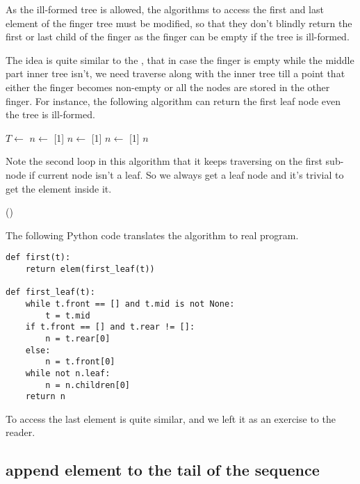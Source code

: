 \documentclass[UTF8]{article}
\begin{document}
As the ill-formed tree is allowed, the algorithms to access the first and last element of the
finger tree must be modified, so that they don't blindly return the first or last child
of the finger as the finger can be empty if the tree is ill-formed.

The idea is quite similar to the , that in case the finger is empty
while the middle part inner tree isn't, we need traverse along with the inner tree till a
point that either the finger becomes non-empty or all the nodes are stored in the
other finger. For instance, the following algorithm can return the first leaf node even
the tree is ill-formed.

\begin{algorithmic}
    \State $T \gets$ 
  \EndWhile
    \State $n \gets$ [1]
  \Else
    \State $n \gets$ [1]
  \EndIf
    \State $n \gets$ [1]
  \EndWhile
  \State \Return $n$
\EndFunction
\end{algorithmic}

Note the second loop in this algorithm that it keeps traversing on the first sub-node
if current node isn't a leaf. So we always get a leaf node and it's trivial to get
the element inside it.

\begin{algorithmic}
  \State \Return {}()
\EndFunction
\end{algorithmic}

The following Python code translates the algorithm to real program.

\lstset{language=Python}
\begin{lstlisting}
def first(t):
    return elem(first_leaf(t))

def first_leaf(t):
    while t.front == [] and t.mid is not None:
        t = t.mid
    if t.front == [] and t.rear != []:
        n = t.rear[0]
    else:
        n = t.front[0]
    while not n.leaf:
        n = n.children[0]
    return n
\end{lstlisting}

To access the last element is quite similar, and we left it as an exercise to the reader.

\subsection{append element to the tail of the sequence}
\end{document}
